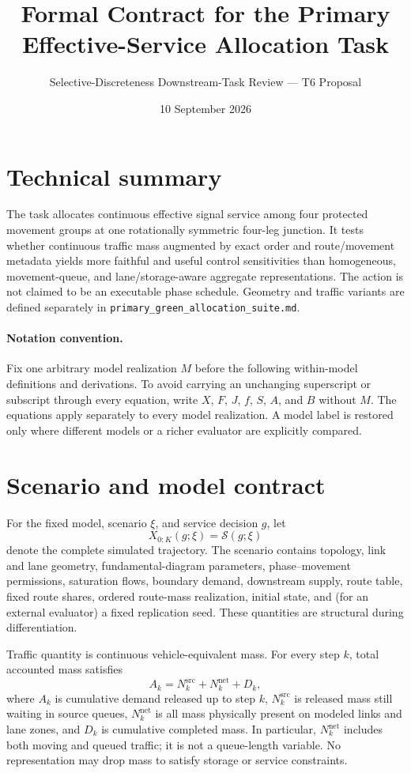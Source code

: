 \documentclass[10pt]{article}
\title{Formal Contract for the Primary Effective-Service Allocation Task}
\author{Selective-Discreteness Downstream-Task Review --- T6 Proposal}
\date{10 September 2026}
\begin{document}
\maketitle

\section*{Technical summary}
The task allocates continuous effective signal service among four protected movement groups at one rotationally symmetric four-leg junction. It tests whether continuous traffic mass augmented by exact order and route/movement metadata yields more faithful and useful control sensitivities than homogeneous, movement-queue, and lane/storage-aware aggregate representations. The action is not claimed to be an executable phase schedule. Geometry and traffic variants are defined separately in \texttt{primary\_green\_allocation\_suite.md}.

\paragraph{Notation convention.} Fix one arbitrary model realization $M$ before the following within-model definitions and derivations. To avoid carrying an unchanging superscript or subscript through every equation, write $X$, $F$, $J$, $f$, $S$, $A$, and $B$ without $M$. The equations apply separately to every model realization. A model label is restored only where different models or a richer evaluator are explicitly compared.

\section{Scenario and model contract}
For the fixed model, scenario $\xi$, and service decision $g$, let
\[
  X_{0:K}(g;\xi)=\mathcal{S}(g;\xi)
\]
denote the complete simulated trajectory. The scenario contains topology, link and lane geometry, fundamental-diagram parameters, phase--movement permissions, saturation flows, boundary demand, downstream supply, route table, fixed route shares, ordered route-mass realization, initial state, and (for an external evaluator) a fixed replication seed. These quantities are structural during differentiation.

Traffic quantity is continuous vehicle-equivalent mass. For every step $k$, total accounted mass satisfies
\[
  A_k = N^{\mathrm{src}}_k + N^{\mathrm{net}}_k + D_k,
\]
where $A_k$ is cumulative demand released up to step $k$, $N^{\mathrm{src}}_k$ is released mass still waiting in source queues, $N^{\mathrm{net}}_k$ is all mass physically present on modeled links and lane zones, and $D_k$ is cumulative completed mass. In particular, $N^{\mathrm{net}}_k$ includes both moving and queued traffic; it is not a queue-length variable. No representation may drop mass to satisfy storage or service constraints.
\end{document}
